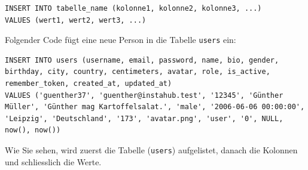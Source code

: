 \begin{lstlisting}[style=sql]
INSERT INTO tabelle_name (kolonne1, kolonne2, kolonne3, ...)
VALUES (wert1, wert2, wert3, ...)
\end{lstlisting}

\begin{myexample}
Folgender Code fügt eine neue Person in die Tabelle \texttt{users} ein:
\begin{lstlisting}[style=sql]
INSERT INTO users (username, email, password, name, bio, gender, birthday, city, country, centimeters, avatar, role, is_active, remember_token, created_at, updated_at) 
VALUES ('guenther37', 'guenther@instahub.test', '12345', 'Günther Müller', 'Günther mag Kartoffelsalat.', 'male', '2006-06-06 00:00:00', 'Leipzig', 'Deutschland', '173', 'avatar.png', 'user', '0', NULL, now(), now())
\end{lstlisting}
Wie Sie sehen, wird zuerst die Tabelle (\texttt{users}) aufgelistet, danach die Kolonnen und schliesslich die Werte.
\end{myexample}

